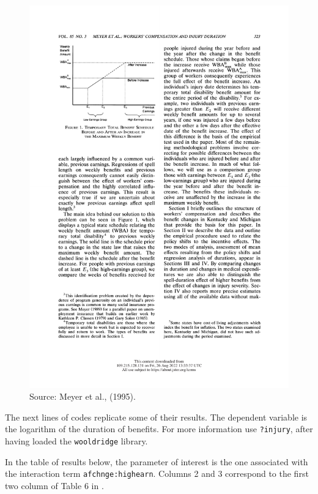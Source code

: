 \documentclass[
  12pt,
]{book}
\theoremstyle{definition}
\theoremstyle{definition}
\theoremstyle{definition}
\theoremstyle{definition}
\theoremstyle{remark}
\begin{document}
\begin{figure}
\includegraphics[width=0.9\linewidth]{images/Figure_Meyer_et_al} \caption{Source: Meyer et al., (1995).}\label{fig:figMeyer}
\end{figure}

The next lines of codes replicate some of their results. The dependent variable is the logarithm of the duration of benefits. For more information use \texttt{?injury}, after having loaded the \texttt{wooldridge} library.

In the table of results below, the parameter of interest is the one associated with the interaction term \texttt{afchnge:highearn}. Columns 2 and 3 correspond to the first two column of Table 6 in \citet{Meyer_Viscusi_Durbin_1995}.
\end{document}
